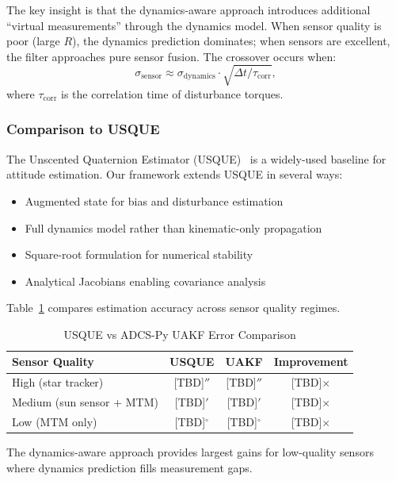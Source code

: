 \documentclass[conference]{IEEEtran}
\begin{document}
The key insight is that the dynamics-aware approach introduces additional ``virtual measurements'' through the dynamics model. When sensor quality is poor (large $R$), the dynamics prediction dominates; when sensors are excellent, the filter approaches pure sensor fusion. The crossover occurs when:
\begin{equation}
\sigma_{\text{sensor}} \approx \sigma_{\text{dynamics}} \cdot \sqrt{\Delta t / \tau_{\text{corr}}},
\end{equation}
where $\tau_{\text{corr}}$ is the correlation time of disturbance torques.


\subsubsection{Comparison to USQUE}
The Unscented Quaternion Estimator (USQUE)~\cite{crassidis_unscented_2003} is a widely-used baseline for attitude estimation. Our framework extends USQUE in several ways:
\begin{itemize}
    \item Augmented state for bias and disturbance estimation
    \item Full dynamics model rather than kinematic-only propagation
    \item Square-root formulation for numerical stability
    \item Analytical Jacobians enabling covariance analysis
\end{itemize}

Table~\ref{tab:usque_comparison} compares estimation accuracy across sensor quality regimes.

\begin{table}[t]
    \centering
    \caption{USQUE vs ADCS-Py UAKF Error Comparison}
    \label{tab:usque_comparison}
    \begin{tabular}{lccc}
        \toprule
        Sensor Quality & USQUE & UAKF & Improvement \\
        \midrule
        High (star tracker) & [TBD]$''$ & [TBD]$''$ & [TBD]$\times$ \\
        Medium (sun sensor + MTM) & [TBD]$'$ & [TBD]$'$ & [TBD]$\times$ \\
        Low (MTM only) & [TBD]$^\circ$ & [TBD]$^\circ$ & [TBD]$\times$ \\
        \bottomrule
    \end{tabular}
    \begin{flushleft}
    \small The dynamics-aware approach provides largest gains for low-quality sensors where dynamics prediction fills measurement gaps.
    \end{flushleft}
\end{table}
\end{document}
